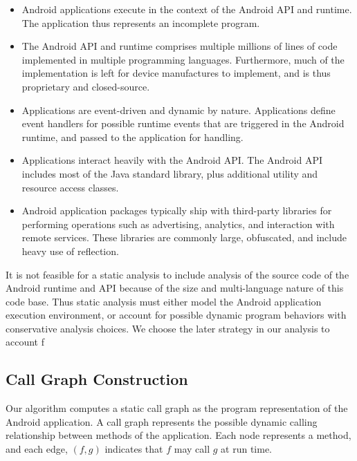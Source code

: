 \begin{itemize}

\item Android applications execute in the context of the Android API
  and runtime.  The application thus represents an incomplete program.
  
\item The Android API and runtime comprises multiple millions of lines of
  code implemented in multiple programming languages.  Furthermore,
  much of the implementation is left for device manufactures to
  implement, and is thus proprietary and closed-source. 

\item Applications are event-driven and dynamic by nature.
  Applications define event handlers for possible runtime events that
  are triggered in the Android runtime, and passed to the application
  for handling. 

\item Applications interact heavily with the Android API.  The Android
  API includes most of the Java standard library, plus additional
  utility and resource access classes.

\item Android application packages typically ship with third-party
  libraries for performing operations such as advertising, analytics,
  and interaction with remote services.  These libraries are commonly
  large, obfuscated, and include heavy use of reflection.

\end{itemize}

It is not feasible for a static analysis to include analysis of the
source code of the Android runtime and API because of the size and
multi-language nature of this code base.  Thus static analysis must
either model the Android application execution environment, or account
for possible dynamic program behaviors with conservative analysis
choices.  We choose the later strategy in our analysis to account f

\subsection{Call Graph Construction}

Our algorithm computes a static call graph as the program
representation of the Android application.  A call graph represents
the possible dynamic calling relationship between methods of the
application.  Each node represents a method, and each edge, $(f,g)$
indicates that $f$ may call $g$ at run time.  



